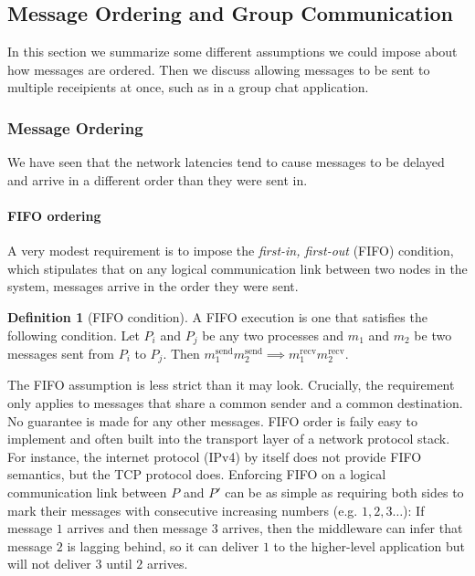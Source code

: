 \documentclass[]             %
{NASA}                       %
\theoremstyle{definition}
\newtheorem{definition}{Definition}[section]
\begin{document}
\subsection{Message Ordering and Group Communication}

In this section we summarize some different assumptions we could
impose about how messages are ordered. Then we discuss allowing
messages to be sent to multiple receipients at once, such as in a
group chat application.

\subsubsection{Message Ordering}
We have seen that the network latencies tend to cause messages to be
delayed and arrive in a different order than they were sent in.

\paragraph{FIFO ordering}
A very modest requirement is to impose the \emph{first-in, first-out}
(FIFO) condition, which stipulates that on any logical communication
link between two nodes in the system, messages arrive in the order
they were sent.

\begin{definition}[FIFO condition]
  A FIFO execution is one that satisfies the following condition. Let
  $P_i$ and $P_j$ be any two processes and $m_1$ and $m_2$ be two
  messages sent from $P_i$ to $P_j$. Then
  $m_1^{\textrm{send}} m_2^{\textrm{send}} \implies
  m_1^{\textrm{recv}} m_2^{\textrm{recv}}$.
\end{definition}

The FIFO assumption is less strict than it may look. Crucially, the
requirement only applies to messages that share a common sender and a
common destination. No guarantee is made for any other messages. FIFO
order is faily easy to implement and often built into the transport
layer of a network protocol stack. For instance, the internet protocol
(IPv4) by itself does not provide FIFO semantics, but the TCP protocol
does. Enforcing FIFO on a logical communication link between $P$ and
$P'$ can be as simple as requiring both sides to mark their messages
with consecutive increasing numbers (e.g. $1,2,3\ldots$): If message
$1$ arrives and then message $3$ arrives, then the middleware can
infer that message $2$ is lagging behind, so it can deliver $1$ to the
higher-level application but will not deliver $3$ until $2$ arrives.
\end{document}
